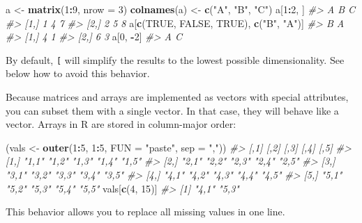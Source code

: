 \documentclass[]{book}
\newenvironment{Shaded}{\begin{snugshade}}{\end{snugshade}}
\newcommand{\KeywordTok}[1]{\textcolor[rgb]{0.13,0.29,0.53}{\textbf{#1}}}
\newcommand{\DataTypeTok}[1]{\textcolor[rgb]{0.13,0.29,0.53}{#1}}
\newcommand{\DecValTok}[1]{\textcolor[rgb]{0.00,0.00,0.81}{#1}}
\newcommand{\StringTok}[1]{\textcolor[rgb]{0.31,0.60,0.02}{#1}}
\newcommand{\CommentTok}[1]{\textcolor[rgb]{0.56,0.35,0.01}{\textit{#1}}}
\newcommand{\OtherTok}[1]{\textcolor[rgb]{0.56,0.35,0.01}{#1}}
\newcommand{\OperatorTok}[1]{\textcolor[rgb]{0.81,0.36,0.00}{\textbf{#1}}}
\newcommand{\NormalTok}[1]{#1}
\theoremstyle{definition}
\theoremstyle{definition}
\theoremstyle{definition}
\theoremstyle{remark}
\begin{document}
\begin{Shaded}
\begin{Highlighting}[]
\NormalTok{a <-}\StringTok{ }\KeywordTok{matrix}\NormalTok{(}\DecValTok{1}\OperatorTok{:}\DecValTok{9}\NormalTok{, }\DataTypeTok{nrow =} \DecValTok{3}\NormalTok{)}
\KeywordTok{colnames}\NormalTok{(a) <-}\StringTok{ }\KeywordTok{c}\NormalTok{(}\StringTok{"A"}\NormalTok{, }\StringTok{"B"}\NormalTok{, }\StringTok{"C"}\NormalTok{)}
\NormalTok{a[}\DecValTok{1}\OperatorTok{:}\DecValTok{2}\NormalTok{, ]}
\CommentTok{#>      A B C}
\CommentTok{#> [1,] 1 4 7}
\CommentTok{#> [2,] 2 5 8}
\NormalTok{a[}\KeywordTok{c}\NormalTok{(}\OtherTok{TRUE}\NormalTok{, }\OtherTok{FALSE}\NormalTok{, }\OtherTok{TRUE}\NormalTok{), }\KeywordTok{c}\NormalTok{(}\StringTok{"B"}\NormalTok{, }\StringTok{"A"}\NormalTok{)]}
\CommentTok{#>      B A}
\CommentTok{#> [1,] 4 1}
\CommentTok{#> [2,] 6 3}
\NormalTok{a[}\DecValTok{0}\NormalTok{, }\OperatorTok{-}\DecValTok{2}\NormalTok{]}
\CommentTok{#>      A C}
\end{Highlighting}
\end{Shaded}

By default, \texttt{{[}} will simplify the results to the lowest
possible dimensionality. See below how to avoid this behavior.

Because matrices and arrays are implemented as vectors with special
attributes, you can subset them with a single vector. In that case, they
will behave like a vector. Arrays in R are stored in column-major order:

\begin{Shaded}
\begin{Highlighting}[]
\NormalTok{(vals <-}\StringTok{ }\KeywordTok{outer}\NormalTok{(}\DecValTok{1}\OperatorTok{:}\DecValTok{5}\NormalTok{, }\DecValTok{1}\OperatorTok{:}\DecValTok{5}\NormalTok{, }\DataTypeTok{FUN =} \StringTok{"paste"}\NormalTok{, }\DataTypeTok{sep =} \StringTok{","}\NormalTok{))}
\CommentTok{#>      [,1]  [,2]  [,3]  [,4]  [,5] }
\CommentTok{#> [1,] "1,1" "1,2" "1,3" "1,4" "1,5"}
\CommentTok{#> [2,] "2,1" "2,2" "2,3" "2,4" "2,5"}
\CommentTok{#> [3,] "3,1" "3,2" "3,3" "3,4" "3,5"}
\CommentTok{#> [4,] "4,1" "4,2" "4,3" "4,4" "4,5"}
\CommentTok{#> [5,] "5,1" "5,2" "5,3" "5,4" "5,5"}
\NormalTok{vals[}\KeywordTok{c}\NormalTok{(}\DecValTok{4}\NormalTok{, }\DecValTok{15}\NormalTok{)]}
\CommentTok{#> [1] "4,1" "5,3"}
\end{Highlighting}
\end{Shaded}

This behavior allows you to replace all missing values in one line.
\end{document}
